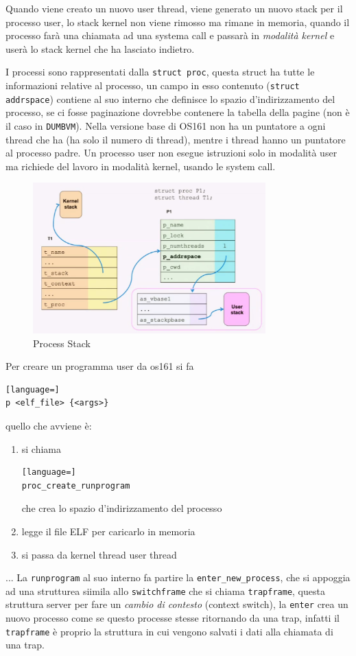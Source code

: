 \documentclass[12pt]{article}
\begin{document}
Quando viene creato un nuovo user thread, viene generato un nuovo stack per il processo user, lo stack kernel non viene rimosso ma rimane in memoria, quando il processo far\`a una chiamata ad una systema call e passar\`a in \emph{modalit\`a kernel} e user\`a lo stack kernel che ha lasciato indietro.

I processi sono rappresentati dalla \texttt{struct proc}, questa struct ha tutte le informazioni relative al processo, un campo in esso contenuto (\texttt{struct addrspace}) contiene al suo interno che definisce lo spazio d'indirizzamento del processo, se ci fosse paginazione dovrebbe contenere la tabella della pagine (non \`e il caso in \texttt{DUMBVM}). Nella versione base di OS161 non ha un puntatore a ogni thread che ha (ha solo il numero di thread), mentre i thread hanno un puntatore al processo padre. Un processo user non esegue istruzioni solo in modalit\`a user ma richiede del lavoro in modalit\`a kernel, usando le system call.
\begin{figure}[H]
  \centering
  \includegraphics[width=0.8\textwidth]{process-stack.png}
  \caption{Process Stack}
  \label{fig:process-stack}
\end{figure}
Per creare un programma user da os161 si fa
\begin{lstlisting}[language=]
p <elf_file> {<args>}
\end{lstlisting}
quello che avviene \`e:
\begin{enumerate}
  \item si chiama 
\begin{lstlisting}[language=]
proc_create_runprogram
\end{lstlisting}
    che crea lo spazio d'indirizzamento del processo
  \item legge il file ELF per caricarlo in memoria
  \item si passa da kernel thread user thread
\end{enumerate}
...
La \texttt{runprogram} al suo interno fa partire la \texttt{enter\_new\_process}, che si appoggia ad una strutturea siimila allo \texttt{switchframe} che si chiama \texttt{trapframe}, questa struttura server per fare un \emph{cambio di contesto} (context switch), la \texttt{enter} crea un nuovo processo come se questo processe stesse ritornando da una trap, infatti il \texttt{trapframe} \`e proprio la struttura in cui vengono salvati i dati alla chiamata di una trap.
\end{document}

